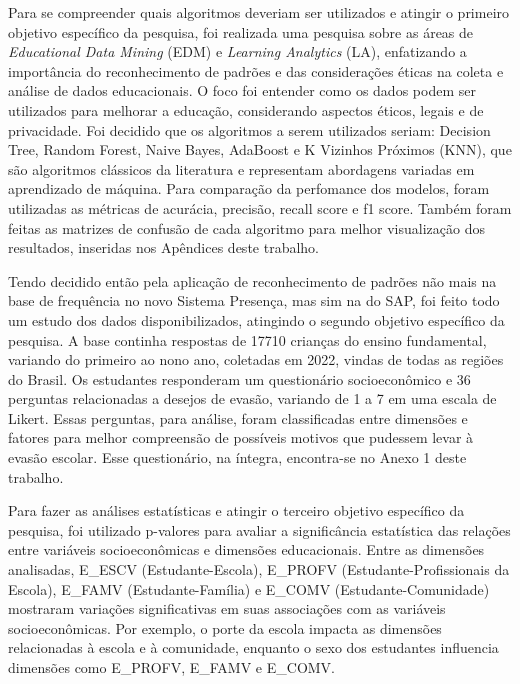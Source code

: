 Para se compreender quais algoritmos deveriam ser utilizados e atingir o primeiro objetivo específico da pesquisa, foi realizada uma pesquisa sobre as áreas de \textit{Educational Data Mining} (EDM) e \textit{Learning Analytics} (LA), enfatizando a importância do reconhecimento de padrões e das considerações éticas na coleta e análise de dados educacionais. O foco foi entender como os dados podem ser utilizados para melhorar a educação, considerando aspectos éticos, legais e de privacidade. Foi decidido que os algoritmos a serem utilizados seriam: Decision Tree, Random Forest, Naive Bayes, AdaBoost e K Vizinhos Próximos (KNN), que são algoritmos clássicos da literatura e representam abordagens variadas em aprendizado de máquina. Para comparação da perfomance dos modelos, foram utilizadas as métricas de acurácia, precisão, recall score e f1 score. Também foram feitas as matrizes de confusão de cada algoritmo para melhor visualização dos resultados, inseridas nos Apêndices deste trabalho.

Tendo decidido então pela aplicação de reconhecimento de padrões não mais na base de frequência no novo Sistema Presença, mas sim na do SAP, foi feito todo um estudo dos dados disponibilizados, atingindo o segundo objetivo específico da pesquisa. A base continha respostas de 17710 crianças do ensino fundamental, variando do primeiro ao nono ano, coletadas em 2022, vindas de todas as regiões do Brasil. Os estudantes responderam um questionário socioeconômico e 36 perguntas relacionadas a desejos de evasão, variando de 1 a 7 em uma escala de Likert. Essas perguntas, para análise, foram classificadas entre dimensões e fatores para melhor compreensão de possíveis motivos que pudessem levar à evasão escolar. Esse questionário, na íntegra, encontra-se no Anexo 1 deste trabalho.

Para fazer as análises estatísticas e atingir o terceiro objetivo específico da pesquisa, foi utilizado p-valores para avaliar a significância estatística das relações entre variáveis socioeconômicas e dimensões educacionais. Entre as dimensões analisadas, E\_ESCV (Estudante-Escola), E\_PROFV (Estudante-Profissionais da Escola), E\_FAMV (Estudante-Família) e E\_COMV (Estudante-Comunidade) mostraram variações significativas em suas associações com as variáveis socioeconômicas. Por exemplo, o porte da escola impacta as dimensões relacionadas à escola e à comunidade, enquanto o sexo dos estudantes influencia dimensões como E\_PROFV, E\_FAMV e E\_COMV.


